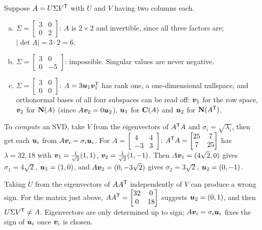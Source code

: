 \begin{example}\label{ex:u37-svd}
Suppose $A=U\Sigma V^{\mathsf{T}}$ with $U$ and $V$ having two columns each.
\begin{enumerate}[(a)]
\item $\Sigma=\begin{bmatrix}3&0\\0&2\end{bmatrix}$: $A$ is $2\times2$ and invertible, since all three factors are; $|\det A|=3\cdot2=6$.
\item $\Sigma=\begin{bmatrix}3&0\\0&-5\end{bmatrix}$: impossible. Singular values are never negative.
\item $\Sigma=\begin{bmatrix}3&0\\0&0\end{bmatrix}$: $A=3\boldsymbol{u}_1\boldsymbol{v}_1^{\mathsf{T}}$ has rank one, a one-dimensional nullspace, and orthonormal bases of all four subspaces can be read off: $\boldsymbol{v}_1$ for the row space, $\boldsymbol{v}_2$ for $\mathbf{N}(A)$ (since $A\boldsymbol{v}_2=0\boldsymbol{u}_2$), $\boldsymbol{u}_1$ for $\mathbf{C}(A)$ and $\boldsymbol{u}_2$ for $\mathbf{N}(A^{\mathsf{T}})$.
\end{enumerate}
To \emph{compute} an SVD, take $V$ from the eigenvectors of $A^{\mathsf{T}} A$ and $\sigma_i=\sqrt{\lambda_i}$, then get each $\boldsymbol{u}_i$ from $A\boldsymbol{v}_i=\sigma_i\boldsymbol{u}_i$. For $A=\begin{bmatrix}4&4\\-3&3\end{bmatrix}$: $A^{\mathsf{T}} A=\begin{bmatrix}25&7\\7&25\end{bmatrix}$ has $\lambda=32,18$ with $\boldsymbol{v}_1=\tfrac{1}{\sqrt2}(1,1)$, $\boldsymbol{v}_2=\tfrac{1}{\sqrt2}(1,-1)$. Then $A\boldsymbol{v}_1=(4\sqrt2,0)$ gives $\sigma_1=4\sqrt2$, $\boldsymbol{u}_1=(1,0)$, and $A\boldsymbol{v}_2=(0,-3\sqrt2)$ gives $\sigma_2=3\sqrt2$, $\boldsymbol{u}_2=(0,-1)$.
\end{example}

\begin{trap}
Taking $U$ from the eigenvectors of $AA^{\mathsf{T}}$ independently of $V$ can produce a wrong sign. For the matrix just above, $AA^{\mathsf{T}}=\begin{bmatrix}32&0\\0&18\end{bmatrix}$ suggests $\boldsymbol{u}_2=(0,1)$, and then $U\Sigma V^{\mathsf{T}}\neq A$. Eigenvectors are only determined up to sign; $A\boldsymbol{v}_i=\sigma_i\boldsymbol{u}_i$ fixes the sign of $\boldsymbol{u}_i$ once $\boldsymbol{v}_i$ is chosen.
\end{trap}

